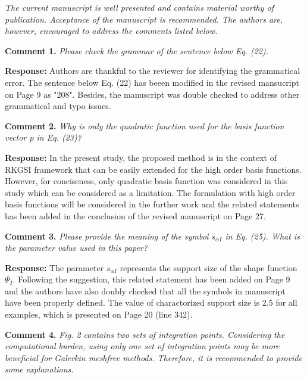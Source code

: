 \documentclass{article}
\begin{document}
\textit{The current manuscript is well presented and contains material worthy of publication. Acceptance of the manuscript is recommended. The authors are, however, encouraged to address the comments listed below.}

\textbf{Comment 1.} \textit{Please check the grammar of the sentence below Eq. (22).}

\textbf{Response:} Authors are thankful to the reviewer for identifying the grammatical error. The sentence below Eq. (22)  has beeen modified in the revised mansucript on Page 9 as "208". Besides, the manuscript was double checked to address other grammatical and typo issues.

\textbf{Comment 2.} \textit{Why is only the quadratic function used for the basis function vector p in Eq. (23)?}

\textbf{Response:} In the present study, the proposed method is in the context of RKGSI framework that can be easily extended for the high order basis functions. However, for conciseness, only quadratic basis function was considered in this study which can be considered as a limitation. The formulation with high order basis functions will be considered in the further work and the related statements has been added  in the conclusion of the revised manuscript on Page 27.

\textbf{Comment 3.} \textit{Please provide the meaning of the symbol $s_{\alpha I}$ in Eq. (25). What is the parameter value used in this paper?}

\textbf{Response:} The parameter $s_{\alpha I}$ represents the support size of the shape function $\Psi_I$. Following the suggestion, this related statement has been added on Page 9 and the authors have also doubly checked that all the symbols in manuscript have been properly defined. The value of charactorized support size is 2.5 for all examples, which is presented on Page 20 (line 342).

\textbf{Comment 4.} \textit{Fig. 2 contains two sets of integration points. Considering the computational burden, using only one set of integration points may be more beneficial for Galerkin meshfree methods. Therefore, it is recommended to provide some explanations.}
\end{document}
